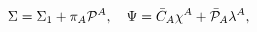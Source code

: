 \begin{equation}\label{6.7}
\Sigma=\Sigma_1+\pi_A{\cal P}^A,\quad\Psi=\bar{C}_A\chi^A+
\bar{\cal P}_A\lambda^A,
\end{equation}

